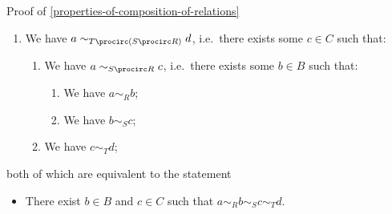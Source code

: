 \begin{Proof}{Proof of \cref{properties-of-composition-of-relations}}
\begin{enumerate}
\begin{enumerate}
            \end{enumerate}
        \item We have $a\sim_{T\procirc(S\procirc R)}d$, i.e.\ there exists some $c\in C$ such that:
            \begin{enumerate}
                \item We have $a\sim_{S\procirc R}c$, i.e.\ there exists some $b\in B$ such that:
                    \begin{enumerate}
                        \item We have $a\sim_{R}b$;
                        \item We have $b\sim_{S}c$;
                    \end{enumerate}
                \item We have $c\sim_{T}d$;
            \end{enumerate}
    \end{enumerate}
    both of which are equivalent to the statement
    \begin{itemize}
        \item There exist $b\in B$ and $c\in C$ such that $a\sim_{R}b\sim_{S}c\sim_{T}d$.
    \end{itemize}


\end{Proof}
